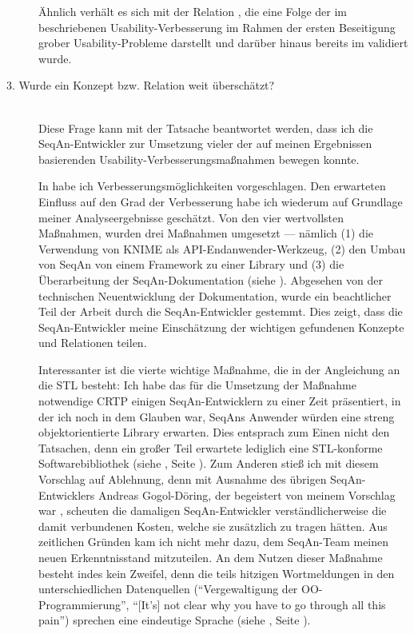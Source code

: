 \begin{description}
  Ähnlich verhält es sich mit der Relation , die eine Folge der im  beschriebenen Usability-Verbesserung im Rahmen der ersten Beseitigung grober Usability-Probleme darstellt und darüber hinaus bereits im  validiert wurde.
  
  
  \item[3. Wurde ein Konzept bzw. Relation weit überschätzt?] \hfill \\
  Diese Frage kann mit der Tatsache beantwortet werden, dass ich die SeqAn-Entwickler zur Umsetzung vieler der auf meinen Ergebnissen basierenden Usability-Verbesserungsmaßnahmen bewegen konnte.
  
  In  habe ich Verbesserungsmöglichkeiten vorgeschlagen. Den erwarteten Einfluss auf den  Grad der Verbesserung habe ich wiederum auf Grundlage meiner Analyseergebnisse geschätzt. Von den vier wertvollsten Maßnahmen, wurden drei Maßnahmen umgesetzt --- nämlich (1) die Verwendung von KNIME als API-Endanwender-Werkzeug, (2) den Umbau von SeqAn von einem Framework zu einer Library und (3) die Überarbeitung der SeqAn-Dokumentation (siehe ). Abgesehen von der technischen Neuentwicklung der Dokumentation, wurde ein beachtlicher Teil der Arbeit durch die SeqAn-Entwickler gestemmt. Dies zeigt, dass die SeqAn-Entwickler meine Einschätzung der wichtigen gefundenen Konzepte und Relationen teilen.
  
  Interessanter ist die vierte wichtige Maßnahme, die in der Angleichung an die STL besteht: Ich habe das für die Umsetzung der Maßnahme notwendige CRTP einigen SeqAn-Entwicklern zu einer Zeit präsentiert, in der ich noch in dem Glauben war, SeqAns Anwender würden eine streng objektorientierte Library erwarten. Dies entsprach zum Einen nicht den Tatsachen, denn ein großer Teil erwartete lediglich eine STL-konforme Softwarebibliothek (siehe , Seite \pageref{sec:paradigmatische-pragung}). Zum Anderen stieß ich mit diesem Vorschlag auf Ablehnung, denn mit Ausnahme des übrigen SeqAn-Entwicklers Andreas Gogol-Döring, der begeistert von meinem Vorschlag war \citep[][siehe ]{GogolDoring:5iYhf2VJ}, scheuten die damaligen SeqAn-Entwickler verständlicherweise die damit verbundenen Kosten, welche sie zusätzlich zu tragen hätten. Aus zeitlichen Gründen kam ich nicht mehr dazu, dem SeqAn-Team meinen neuen Erkenntnisstand mitzuteilen. An dem Nutzen dieser Maßnahme besteht indes kein Zweifel, denn die teils hitzigen Wortmeldungen in den unterschiedlichen Datenquellen (``Vergewaltigung der OO-Programmierung'', ``[It's] not clear why you have to go through all this pain'') sprechen eine eindeutige Sprache (siehe , Seite \pageref{sec:stl-inconsistencies}).  
  

\end{description}
